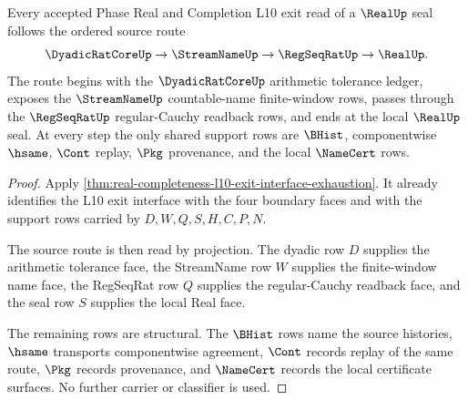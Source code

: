 \begin{theorem}
\label{thm:real-streamname-regseqrat-dyadic-audit-route}
Every accepted Phase Real and Completion L10 exit read of a $\RealUp$ seal follows the ordered source route
$$
\DyadicRatCoreUp \to \StreamNameUp \to \RegSeqRatUp \to \RealUp.
$$
The route begins with the $\DyadicRatCoreUp$ arithmetic tolerance ledger, exposes the $\StreamNameUp$ countable-name finite-window rows, passes through the $\RegSeqRatUp$ regular-Cauchy readback rows, and ends at the local $\RealUp$ seal. At every step the only shared support rows are $\BHist$, componentwise $\hsame$, $\Cont$ replay, $\Pkg$ provenance, and the local $\NameCert$ rows.
\end{theorem}
\begin{proof}
Apply \autoref{thm:real-completeness-l10-exit-interface-exhaustion}. It already identifies the L10 exit interface with the four boundary faces and with the support rows carried by $D,W,Q,S,H,C,P,N$.

The source route is then read by projection. The dyadic row $D$ supplies the arithmetic tolerance face, the StreamName row $W$ supplies the finite-window name face, the RegSeqRat row $Q$ supplies the regular-Cauchy readback face, and the seal row $S$ supplies the local Real face.

The remaining rows are structural. The $\BHist$ rows name the source histories, $\hsame$ transports componentwise agreement, $\Cont$ records replay of the same route, $\Pkg$ records provenance, and $\NameCert$ records the local certificate surfaces. No further carrier or classifier is used.
\end{proof}

